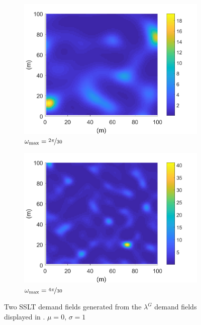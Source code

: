 \documentclass[12pt,dvipsnames]{report}
\begin{document}
\begin{figure}[ht]
	\centering
	\begin{subfigure}{.49\textwidth}
		\centering
		\includegraphics[width=1\linewidth]{lambda_O2pi-300_L100000_X100_Y100}
		\caption{\small $\omega_{\max}=\nicefrac{2 \pi}{30}$}
		\label{fig:lambda_2pi-300}
	\end{subfigure} \hfill
	\begin{subfigure}{.49\textwidth}
		\centering
		\includegraphics[width=1\linewidth]{lambda_O4pi-300_L100000_X100_Y100}
		\caption{\small $\omega_{\max}=\nicefrac{4 \pi}{30}$}
		\label{fig:lambda_4pi-300}
	\end{subfigure}
	\caption[Generated example SSLT demand fields]{\small Two SSLT demand fields generated from the $\lambda^G$ demand fields displayed in . $\mu = 0,\, \sigma = 1$}
	\label{fig:lambda}
\end{figure}
\end{document}
